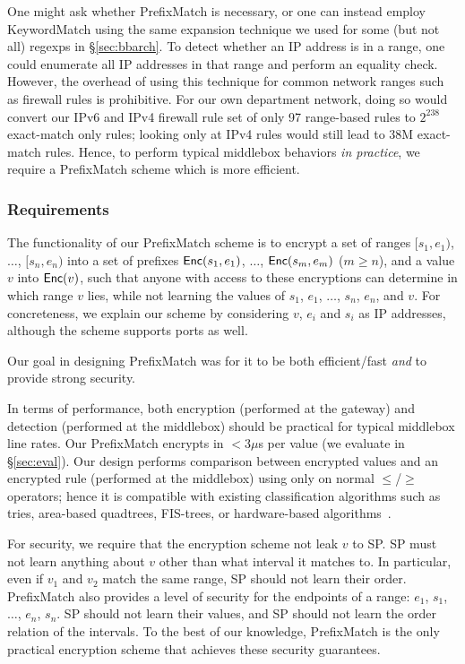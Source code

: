 One might ask whether PrefixMatch is necessary, or one can instead employ KeywordMatch using the same expansion technique we used for some (but not all) regexps in \S\ref{sec:bbarch}. 
To detect whether an IP address is in a range, one could enumerate all IP addresses in that range and perform an equality check. However, the overhead of using this technique for common network ranges such as firewall rules is prohibitive.
For our own department network, doing so would convert our IPv6 and IPv4 firewall rule set of only 97 range-based rules to $2^{238}$ exact-match only rules; looking only at IPv4 rules would still lead to 38M exact-match rules.
Hence, to perform typical middlebox behaviors {\it in practice}, we require a PrefixMatch scheme which is more efficient.

\subsubsection{Requirements}
The functionality of our PrefixMatch scheme is to encrypt a set of ranges $[s_1, e_1)$, $\dots$, $[s_n, e_n)$ into a set of prefixes $\mathsf{Enc}(s_1, e_1)$, $\dots$, $\mathsf{Enc}(s_m, e_m)$ ($m \geq n$), and a value $v$ into $\mathsf{Enc}(v)$, such that anyone with access to these encryptions can determine in which range $v$ lies, while not learning the values of $s_1$, $e_1$, $\dots$, $s_n$, $e_n$, and $v$. 
For concreteness, we explain our scheme by considering $v$, $e_i$ and $s_i$ as IP addresses, although the scheme supports ports as well.

Our goal in designing PrefixMatch was for it to be both efficient/fast {\em and} to provide strong security.

In terms of performance, both encryption (performed at the gateway) and detection (performed at the middlebox) should be practical for typical middlebox line rates.
Our PrefixMatch encrypts in $< 3\mu$s per value  (we evaluate in \S\ref{sec:eval}).
Our design performs comparison between encrypted values and an encrypted rule (performed at the middlebox) using only on normal $\leq$/$\geq$ operators; hence it is compatible with existing classification algorithms such as tries, area-based quadtrees, FIS-trees, or hardware-based algorithms~\cite{packet_classif}.

For security, we require that the encryption scheme  not leak $v$ to SP.
SP must not learn anything about $v$ other than what interval it matches to. 
In  particular, even if $v_1$ and $v_2$ match the same range, SP should not learn their order.
PrefixMatch also provides a level of security for the endpoints of a range:
 $e_1$, $s_1$, $\dots$, $e_n$, $s_n$. SP should not learn their values, and SP should not learn the order relation of the intervals. 
To the best of our knowledge, PrefixMatch is the only practical encryption scheme that achieves these security guarantees.

